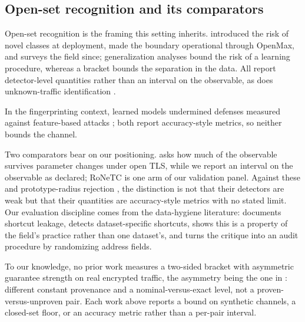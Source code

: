 \subsection{Open-set recognition and its comparators}
\label{sec:related/openset}

Open-set recognition is the framing this setting inherits.
\citet{scheirer2013toward} introduced the risk of novel classes at deployment,
\citet{bendale2016towards} made the boundary operational through OpenMax, and
\citet{geng2021recent} surveys the field since; generalization analyses
\citep{fang2021learning,garov2025closer} bound the risk of a learning procedure,
whereas a bracket bounds the separation in the data. All report detector-level
quantities rather than an interval on the observable, as does
unknown-traffic identification \citep{hu2022opencbd,li2023facing}.

In the fingerprinting context, learned models undermined defenses measured
against feature-based attacks \citep{sirinam2018deep,rimmer2018automated}; both
report accuracy-style metrics, so neither bounds the channel.

Two comparators bear on our positioning.
\citet{shamsimukhametov2023indistinguishability} asks how much of the observable
survives parameter changes under open TLS, while we report an interval on the
observable as declared; RoNeTC \citep{wang2025reliable} is one arm of our
validation panel. Against these and prototype-radius rejection
\citep{qu2026sepspace}, the distinction is not that their detectors are weak but
that their quantities are accuracy-style metrics with no stated limit. Our evaluation
discipline comes from the data-hygiene literature: \citet{zhao2025sweet}
documents shortcut leakage, \citet{wang2026bias} detects dataset-specific
shortcuts, \citet{wickramasinghe2025sok} shows this is a property of the field's
practice rather than one dataset's, and \citet{zhao2026shortcutcatcher} turns
the critique into an audit procedure by randomizing address fields.

To our knowledge, no prior work measures a two-sided bracket with asymmetric
guarantee strength on real encrypted traffic, the asymmetry being the one in
: different constant provenance and a
nominal-versus-exact level, not a proven-versus-unproven pair. Each work above
reports a bound on synthetic channels, a closed-set floor, or an accuracy metric
rather than a per-pair interval. \label{sec:related/novelty}
